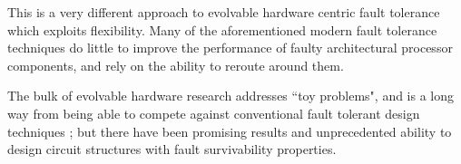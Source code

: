 This is a very different approach to evolvable hardware centric fault
tolerance which exploits flexibility. Many of the aforementioned modern
fault tolerance techniques do little to improve the performance of faulty architectural
processor components, and rely on the ability to reroute around them.

The bulk of evolvable hardware research addresses ``toy problems", and is a long
way from being able to compete against conventional fault tolerant design
techniques \cite{4291951}; but there have been promising results and unprecedented
ability to design circuit structures with fault survivability properties.
